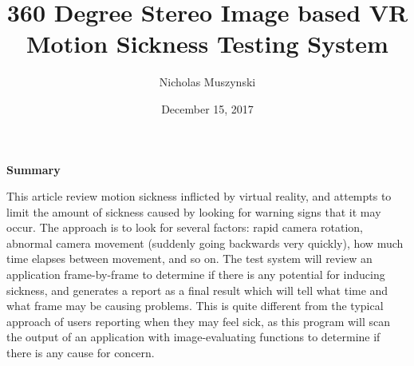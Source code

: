 \documentclass{article}
\begin{document}
\title{360 Degree Stereo Image based VR Motion Sickness Testing System}
\author{Nicholas Muszynski}
\date{December 15, 2017}

\maketitle

\textbf{Summary}
\newline

This article review motion sickness inflicted by virtual reality, and attempts to limit the amount of sickness caused by looking for warning signs that it may occur. The approach is to look for several factors: rapid camera rotation, abnormal camera movement (suddenly going backwards very quickly), how much time elapses between movement, and so on. The test system will review an application frame-by-frame to determine if there is any potential for inducing sickness, and generates a report as a final result which will tell what time and what frame may be causing problems. This is quite different from the typical approach of users reporting when they may feel sick, as this program will scan the output of an application with image-evaluating functions to determine if there is any cause for concern.

\nocite{motionSicknessCite}



\end{document}
